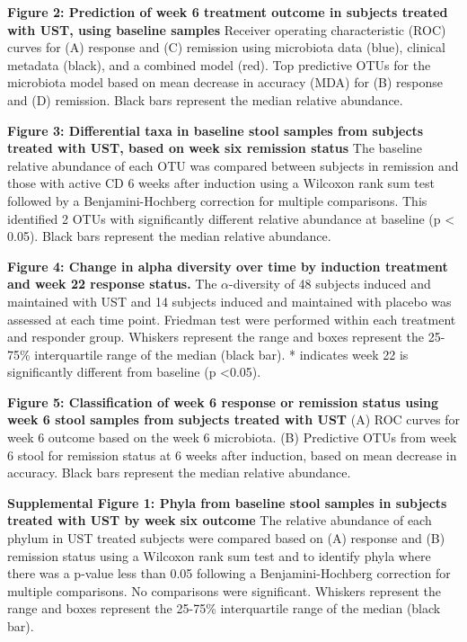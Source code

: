 \documentclass[12pt,]{article}
\begin{document}
\textbf{Figure 2: Prediction of week 6 treatment outcome in subjects
treated with UST, using baseline samples} Receiver operating
characteristic (ROC) curves for (A) response and (C) remission using
microbiota data (blue), clinical metadata (black), and a combined model
(red). Top predictive OTUs for the microbiota model based on mean
decrease in accuracy (MDA) for (B) response and (D) remission. Black
bars represent the median relative abundance.

\textbf{Figure 3: Differential taxa in baseline stool samples from
subjects treated with UST, based on week six remission status} The
baseline relative abundance of each OTU was compared between subjects in
remission and those with active CD 6 weeks after induction using a
Wilcoxon rank sum test followed by a Benjamini-Hochberg correction for
multiple comparisons. This identified 2 OTUs with significantly
different relative abundance at baseline (p \textless{} 0.05). Black
bars represent the median relative abundance.

\textbf{Figure 4: Change in alpha diversity over time by induction
treatment and week 22 response status.} The \({\alpha}\)-diversity of 48
subjects induced and maintained with UST and 14 subjects induced and
maintained with placebo was assessed at each time point. Friedman test
were performed within each treatment and responder group. Whiskers
represent the range and boxes represent the 25-75\% interquartile range
of the median (black bar). * indicates week 22 is significantly
different from baseline (p \textless{}0.05).

\textbf{Figure 5: Classification of week 6 response or remission status
using week 6 stool samples from subjects treated with UST} (A) ROC
curves for week 6 outcome based on the week 6 microbiota. (B) Predictive
OTUs from week 6 stool for remission status at 6 weeks after induction,
based on mean decrease in accuracy. Black bars represent the median
relative abundance.

\textbf{Supplemental Figure 1: Phyla from baseline stool samples in
subjects treated with UST by week six outcome} The relative abundance of
each phylum in UST treated subjects were compared based on (A) response
and (B) remission status using a Wilcoxon rank sum test and to identify
phyla where there was a p-value less than 0.05 following a
Benjamini-Hochberg correction for multiple comparisons. No comparisons
were significant. Whiskers represent the range and boxes represent the
25-75\% interquartile range of the median (black bar).
\end{document}
